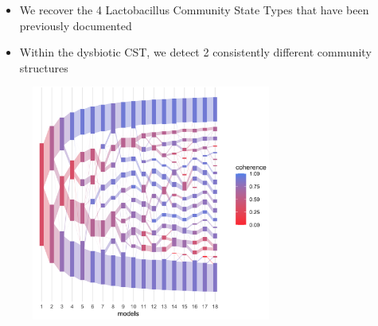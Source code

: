 \documentclass[hyperref={colorlinks=true, linkcolor=violet, citecolor=SeaGreen}]{beamer}
\begin{document}
\begin{frame}
  \begin{itemize}
    \item We recover the 4 Lactobacillus Community State Types that have been
    previously documented
    \item Within the dysbiotic CST, we detect 2 consistently different community
    structures
  \end{itemize}
  \begin{figure}
    \includegraphics[width=0.7\textwidth]{microbiome_coherence}
  \end{figure}
\end{frame}
\end{document}
